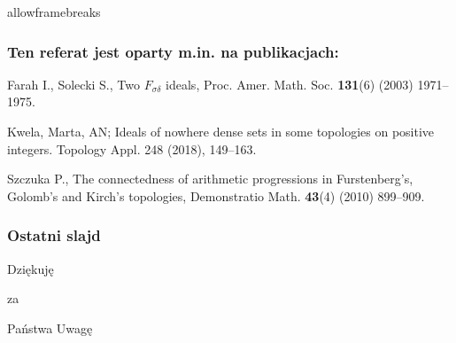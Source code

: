 \documentclass{beamer}
\begin{document}
\begin{frame}[label=bibliografia]{allowframebreaks}
\frametitle{Ten referat jest oparty m.in. na publikacjach:}
\beamertemplatebookbibitems
\begin{thebibliography}{10}{
{\sc Farah I., Solecki S.}, {Two $F_{\sigma\delta}$ ideals},
Proc. Amer. Math. Soc. {\bf 131}(6) (2003) 1971--1975.

\hyperlink{powrotIF}{}

 {\sc Kwela, Marta, AN;} {Ideals of nowhere dense sets in some topologies on positive integers.} Topology Appl. 248 (2018), 149–163.
}
{\sc Szczuka P.}, {The connectedness of arithmetic progressions in Furstenberg's, Golomb's and Kirch's topologies},
Demonstratio Math. {\bf 43}(4) (2010) 899--909.

\hyperlink{powrotPS}{}

\end{thebibliography}
\end{frame}

\begin{frame}\frametitle{Ostatni slajd}
\begin{center}{\Huge Dziękuję}\end{center}
\begin{center}{\Huge za}\end{center}
\begin{center}{\Huge Państwa Uwagę}\end{center}
\end{frame}
\end{document}

